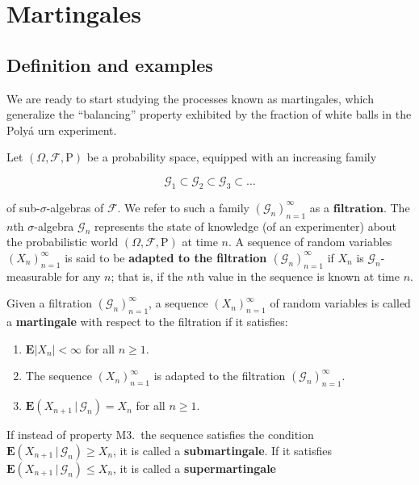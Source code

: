 

\chapter{Martingales}

\section{Definition and examples}
We are ready to start studying the processes known as
martingales, which generalize the ``balancing''
property exhibited by the fraction of white balls in
the Poly\'a urn experiment.

Let $(\Omega, \mathcal{F}, \mathrm{P})$ be a
probability space, equipped with an increasing family

\[
\mathcal{G}_1 \subset \mathcal{G}_2 \subset \mathcal{G}_3 \subset \ldots
\]

\noindent of sub-$\sigma$-algebras of $\mathcal{F}$. We refer
to such a family $(\mathcal{G}_n)_{n=1}^\infty$ as a
$\textbf{filtration}$. The $n$th $\sigma$-algebra
$\mathcal{G}_n$ represents the state of knowledge (of
an experimenter) about the probabilistic world
$(\Omega, \mathcal{F}, \mathrm{P})$ at time $n$. A
sequence of random variables $(X_n)_{n=1}^\infty$ is
said to be \textbf{adapted to the filtration
$(\mathcal{G}_n)_{n=1}^\infty$} if $X_n$ is
$\mathcal{G}_n$-measurable for any $n$; that is, if
the $n$th value in the sequence is known at time $n$.

\begin{defn}
Given a filtration $(\mathcal{G}_n)_{n=1}^\infty$, a
sequence $(X_n)_{n=1}^\infty$ of random variables is
called a \textbf{martingale} with respect to the filtration
if it satisfies:

\begin{enumerate}[label=\arabic*.]
\item $\mathbf{E}|X_n|<\infty$ for all $n\ge1$.

\item The sequence $(X_n)_{n=1}^\infty$ is adapted to the
filtration $(\mathcal{G}_n)_{n=1}^\infty$.

\item $\mathbf{E}\left(X_{n+1}\,|\,\mathcal{G}_n\right) =
X_n$
for all $n\ge 1$.
\end{enumerate}

\noindent If instead of property M3.\ the sequence satisfies
the condition
$\mathbf{E}\left(X_{n+1}\,|\,\mathcal{G}_n\right) \ge
X_n$,
it is called a \textbf{submartingale}. If it satisfies
$\mathbf{E}\left(X_{n+1}\,|\,\mathcal{G}_n\right) \le
X_n$,
it is called a \textbf{supermartingale}
\end{defn}

